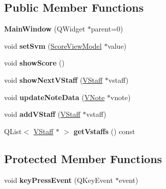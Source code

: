 \subsection*{Public Member Functions}
\begin{DoxyCompactItemize}
\item 
\hypertarget{class_main_window_a8b244be8b7b7db1b08de2a2acb9409db}{}{\bfseries Main\+Window} (Q\+Widget $\ast$parent=0)\label{class_main_window_a8b244be8b7b7db1b08de2a2acb9409db}

\item 
\hypertarget{class_main_window_a24fce628de02495376e8c1724c077f2a}{}void {\bfseries set\+Svm} (\hyperlink{class_score_view_model}{Score\+View\+Model} $\ast$value)\label{class_main_window_a24fce628de02495376e8c1724c077f2a}

\item 
\hypertarget{class_main_window_a6634f1163a8752a689aa7ff6ffc0e4b1}{}void {\bfseries show\+Score} ()\label{class_main_window_a6634f1163a8752a689aa7ff6ffc0e4b1}

\item 
\hypertarget{class_main_window_a29b23178fefbc36a440072d0c9ded820}{}void {\bfseries show\+Next\+V\+Staff} (\hyperlink{class_v_staff}{V\+Staff} $\ast$vstaff)\label{class_main_window_a29b23178fefbc36a440072d0c9ded820}

\item 
\hypertarget{class_main_window_a4d8d7633f5fcbe11cd1a046301060b96}{}void {\bfseries update\+Note\+Data} (\hyperlink{class_v_note}{V\+Note} $\ast$vnote)\label{class_main_window_a4d8d7633f5fcbe11cd1a046301060b96}

\item 
\hypertarget{class_main_window_a11b07925a93ef53750a9da3993c05701}{}void {\bfseries add\+V\+Staff} (\hyperlink{class_v_staff}{V\+Staff} $\ast$vstaff)\label{class_main_window_a11b07925a93ef53750a9da3993c05701}

\item 
\hypertarget{class_main_window_a7345a180da85799035f01dda512ad8d3}{}Q\+List$<$ \hyperlink{class_v_staff}{V\+Staff} $\ast$ $>$ {\bfseries get\+Vstaffs} () const \label{class_main_window_a7345a180da85799035f01dda512ad8d3}

\end{DoxyCompactItemize}
\subsection*{Protected Member Functions}
\begin{DoxyCompactItemize}
\item 
\hypertarget{class_main_window_a9c4f542263838b9ecd06eae839a42a34}{}void {\bfseries key\+Press\+Event} (Q\+Key\+Event $\ast$event)\label{class_main_window_a9c4f542263838b9ecd06eae839a42a34}

\end{DoxyCompactItemize}


